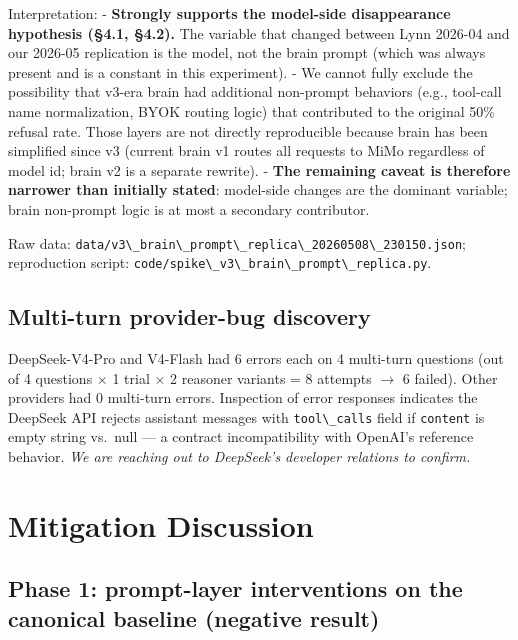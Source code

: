 \documentclass[11pt]{article}
\providecommand{\passthrough}[1]{#1}
\begin{document}
Interpretation: - \textbf{Strongly supports the model-side disappearance
hypothesis (§4.1, §4.2).} The variable that changed between Lynn 2026-04
and our 2026-05 replication is the model, not the brain prompt (which
was always present and is a constant in this experiment). - We cannot
fully exclude the possibility that v3-era brain had additional
non-prompt behaviors (e.g., tool-call name normalization, BYOK routing
logic) that contributed to the original 50\% refusal rate. Those layers
are not directly reproducible because brain has been simplified since v3
(current brain v1 routes all requests to MiMo regardless of model id;
brain v2 is a separate rewrite). - \textbf{The remaining caveat is
therefore narrower than initially stated}: model-side changes are the
dominant variable; brain non-prompt logic is at most a secondary
contributor.

Raw data:
\passthrough{\lstinline!data/v3\_brain\_prompt\_replica\_20260508\_230150.json!};
reproduction script:
\passthrough{\lstinline!code/spike\_v3\_brain\_prompt\_replica.py!}.

\subsection{Multi-turn provider-bug
discovery}\label{sec:multi-turn-provider-bug-discovery}

DeepSeek-V4-Pro and V4-Flash had 6 errors each on 4 multi-turn questions
(out of 4 questions $\times$ 1 trial $\times$ 2 reasoner variants = 8 attempts $\rightarrow$ 6
failed). Other providers had 0 multi-turn errors. Inspection of error
responses indicates the DeepSeek API rejects assistant messages with
\passthrough{\lstinline!tool\_calls!} field if
\passthrough{\lstinline!content!} is empty string vs.~null --- a
contract incompatibility with OpenAI's reference behavior. \emph{We are
reaching out to DeepSeek's developer relations to confirm.}



\section{Mitigation Discussion}\label{sec:mitigation-discussion}

\subsection{Phase 1: prompt-layer interventions on the canonical
baseline (negative
result)}\label{sec:phase-1-prompt-layer-interventions-on-the-canonical-baseline-negative-result}
\end{document}
